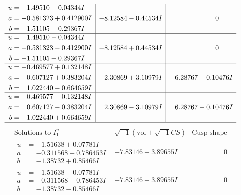 \documentclass[1p]{elsarticle_modified}
\theoremstyle{definition}
\newcommand{\I}{\sqrt{-1}}
\begin{document}
$$\begin{array}{c|c|c}
\begin{aligned}
u &= \phantom{-}1.49510 + 0.04344 I \\
a &= -0.581323 + 0.412900 I \\
b &= -1.51105 - 0.29367 I\end{aligned}
 & -8.12584 - 0.44534 I & \phantom{-0.000000 } 0 \\ \hline\begin{aligned}
u &= \phantom{-}1.49510 - 0.04344 I \\
a &= -0.581323 - 0.412900 I \\
b &= -1.51105 + 0.29367 I\end{aligned}
 & -8.12584 + 0.44534 I & \phantom{-0.000000 } 0 \\ \hline\begin{aligned}
u &= -0.469577 + 0.132148 I \\
a &= \phantom{-}0.607127 + 0.383204 I \\
b &= \phantom{-}1.022440 - 0.664659 I\end{aligned}
 & \phantom{-}2.30869 + 3.10979 I & \phantom{-}6.28767 + 0.10476 I \\ \hline\begin{aligned}
u &= -0.469577 - 0.132148 I \\
a &= \phantom{-}0.607127 - 0.383204 I \\
b &= \phantom{-}1.022440 + 0.664659 I\end{aligned}
 & \phantom{-}2.30869 - 3.10979 I & \phantom{-}6.28767 - 0.10476 I\\
 \hline 
 \end{array}$$\newpage$$\begin{array}{c|c|c}  
\text{Solutions to }I^u_{1}& \I (\text{vol} + \sqrt{-1}CS) & \text{Cusp shape}\\
 \hline 
\begin{aligned}
u &= -1.51638 + 0.07781 I \\
a &= -0.311568 - 0.786453 I \\
b &= -1.38732 + 0.85466 I\end{aligned}
 & -7.83146 + 3.89655 I & \phantom{-0.000000 } 0 \\ \hline\begin{aligned}
u &= -1.51638 - 0.07781 I \\
a &= -0.311568 + 0.786453 I \\
b &= -1.38732 - 0.85466 I\end{aligned}
 & -7.83146 - 3.89655 I & \phantom{-0.000000 } 0 \\ \hline\begin{aligned}

\end{aligned}
\end{array}$$
\end{document}
